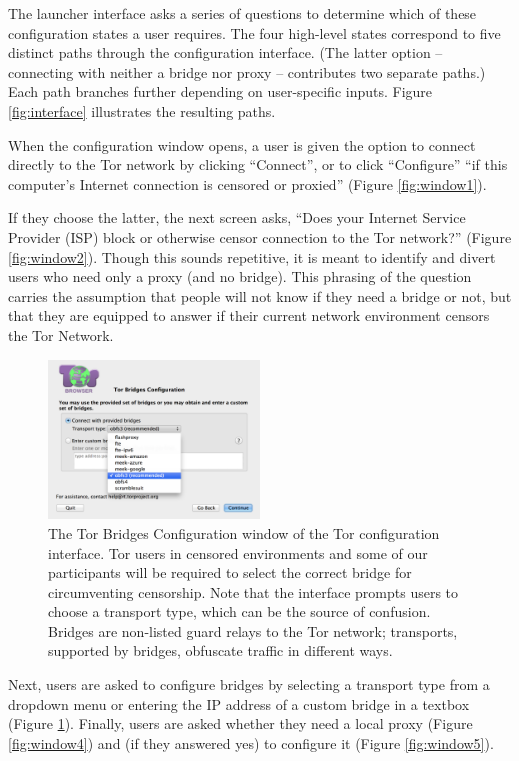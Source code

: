 \documentclass{template}
\begin{document}
The launcher interface asks a series of questions to
determine which of these configuration states a user requires.
The four high-level states correspond to five distinct paths through the
configuration interface. (The latter option -- connecting with neither a bridge
nor proxy -- contributes two separate paths.) Each path branches further
depending on user-specific inputs. Figure \ref{fig:interface} illustrates the
resulting paths. 

When the configuration window opens, a user is given the option to connect
directly to the Tor network by clicking ``Connect'', or to click ``Configure''
``if this computer's Internet connection is censored or proxied'' (Figure
\ref{fig:window1}).

If they choose the latter, the next screen asks, ``Does your Internet Service
Provider (ISP) block or otherwise censor connection to the Tor network?''
(Figure \ref{fig:window2}). Though this sounds repetitive, it is meant to
identify and divert users who need only a proxy (and no bridge).
This phrasing of the question carries the assumption that people will
not know if they need a bridge or not, but that they are equipped to answer if their
current network environment censors the Tor Network. 

\begin{figure}[h]
\label{fig:bridges}
  \centering
    \includegraphics[width=0.5\textwidth]{configuration-screenshot.png}
    \caption{The Tor Bridges Configuration window of the Tor configuration
    interface. Tor users in censored environments and some of our participants
    will be required to select the correct bridge for circumventing censorship.
    Note that the interface prompts users to choose a transport type, which can be
    the source of confusion. Bridges are non-listed guard relays to the Tor
    network; transports, supported by bridges, obfuscate traffic in
    different ways.}
\end{figure}

Next, users are asked to configure bridges by selecting a transport type from a
dropdown menu or entering the IP address of a custom bridge in a textbox (Figure
\ref{fig:bridges}).
Finally, users are asked whether they need a local proxy (Figure
\ref{fig:window4}) and (if they answered yes) to configure it (Figure
\ref{fig:window5}).
\end{document}
